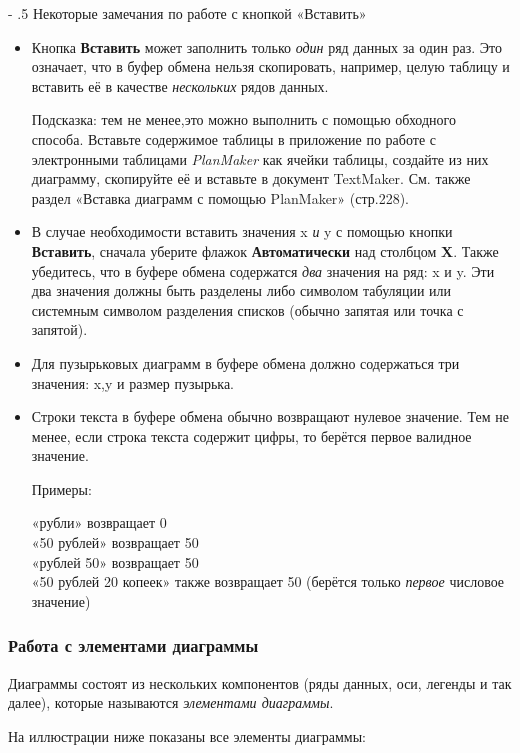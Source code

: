\documentclass[a4paper,10pt]{article}
\makeatletter
\renewcommand\paragraph{%
   \@startsection{paragraph}{4}{0mm}%
      {-\baselineskip}%
      {.5\baselineskip}%
      {\normalfont\normalsize\bfseries}}
\makeatother
\begin{document}
\paragraph{Некоторые замечания по работе с кнопкой «Вставить»}
\begin{itemize}
 \item Кнопка \textbf{Вставить} может заполнить только \textit{один} ряд данных за один раз. Это означает, что в буфер обмена нельзя скопировать, например, целую таблицу и вставить её в качестве \textit{нескольких} рядов данных.
 
 Подсказка: тем не менее,это можно выполнить с помощью обходного способа. Вставьте содержимое таблицы в приложение по работе с электронными таблицами \textit{PlanMaker} как ячейки таблицы, создайте из них диаграмму, скопируйте её и вставьте в документ TextMaker. См. также раздел «Вставка диаграмм с помощью PlanMaker» (стр.228).
 \item В случае необходимости вставить значения x \textit{и} y с помощью кнопки \textbf{Вставить}, сначала уберите флажок \textbf{Автоматически} над столбцом \textbf{X}. Также убедитесь, что в буфере обмена содержатся \textit{два} значения на ряд: x и y. Эти два значения должны быть разделены либо символом табуляции или системным символом разделения списков (обычно запятая или точка с запятой).
 \item  Для пузырьковых диаграмм в буфере обмена должно содержаться три значения: x,y и размер пузырька.
 \item Строки текста в буфере обмена обычно возвращают нулевое значение. Тем не менее, если строка текста содержит цифры, то берётся первое валидное значение.
 
 Примеры:
 
 «рубли» возвращает 0\\
 «50 рублей» возвращает 50\\
 «рублей 50» возвращает 50\\
 «50 рублей 20 копеек» также возвращает 50 (берётся только \textit{первое} числовое значение)
\end{itemize}

\subsubsection{Работа с элементами диаграммы}
Диаграммы состоят из нескольких компонентов (ряды данных, оси, легенды и так далее), которые называются \textit{элементами диаграммы}.

На иллюстрации ниже показаны все элементы диаграммы:
\end{document}
